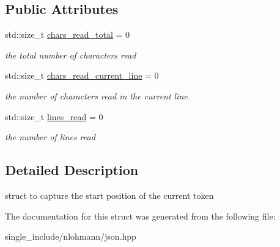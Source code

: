 \subsection*{Public Attributes}
\begin{DoxyCompactItemize}
\item 
\mbox{\label{structnlohmann_1_1detail_1_1position__t_a94cf85cd91d478c20ae143eba906ea1a}} 
std\+::size\+\_\+t \hyperlink{structnlohmann_1_1detail_1_1position__t_a94cf85cd91d478c20ae143eba906ea1a}{chars\+\_\+read\+\_\+total} = 0
\begin{DoxyCompactList}\small\item\em the total number of characters read \end{DoxyCompactList}\item 
\mbox{\label{structnlohmann_1_1detail_1_1position__t_a74df94563dd32102152ceb8c6d9041d8}} 
std\+::size\+\_\+t \hyperlink{structnlohmann_1_1detail_1_1position__t_a74df94563dd32102152ceb8c6d9041d8}{chars\+\_\+read\+\_\+current\+\_\+line} = 0
\begin{DoxyCompactList}\small\item\em the number of characters read in the current line \end{DoxyCompactList}\item 
\mbox{\label{structnlohmann_1_1detail_1_1position__t_a4bbad8bc2c0d17c1b61c3ce729908b71}} 
std\+::size\+\_\+t \hyperlink{structnlohmann_1_1detail_1_1position__t_a4bbad8bc2c0d17c1b61c3ce729908b71}{lines\+\_\+read} = 0
\begin{DoxyCompactList}\small\item\em the number of lines read \end{DoxyCompactList}\end{DoxyCompactItemize}


\subsection{Detailed Description}
struct to capture the start position of the current token 

The documentation for this struct was generated from the following file\+:\begin{DoxyCompactItemize}
\item 
single\+\_\+include/nlohmann/json.\+hpp\end{DoxyCompactItemize}
